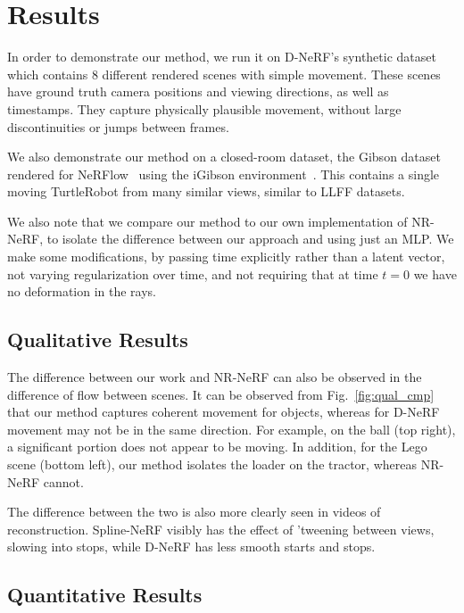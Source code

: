 \section*{Results}

In order to demonstrate our method, we run it on D-NeRF's synthetic dataset which contains 8 different rendered scenes with simple movement. These scenes have ground truth camera positions and viewing directions, as well as timestamps. They capture physically plausible movement, without large discontinuities or jumps between frames.

We also demonstrate our method on a closed-room dataset, the Gibson dataset rendered for NeRFlow~\cite{du2021nerflow} using the iGibson environment~\cite{xu2019DISN}. This contains a single moving TurtleRobot from many similar views, similar to LLFF datasets.

We also note that we compare our method to our own implementation of NR-NeRF, to isolate the difference between our approach and using just an MLP. We make some modifications, by passing time explicitly rather than a latent vector, not varying regularization over time, and not requiring that at time $t=0$ we have no deformation in the rays.

\subsection*{Qualitative Results}

The difference between our work and NR-NeRF can also be observed in the difference of flow between scenes. It can be observed from Fig.~\ref{fig:qual_cmp} that our method captures coherent movement for objects, whereas for D-NeRF movement may not be in the same direction. For example, on the ball (top right), a significant portion does not appear to be moving. In addition, for the Lego scene (bottom left), our method isolates the loader on the tractor, whereas NR-NeRF cannot.

The difference between the two is also more clearly seen in videos of reconstruction. Spline-NeRF visibly has the effect of 'tweening between views, slowing into stops, while D-NeRF has less smooth starts and stops.

\subsection*{Quantitative Results}

